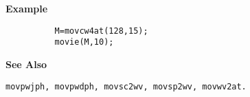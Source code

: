 {\bf \large {}\selectfont Example}
\begin{verbatim}
          M=movcw4at(128,15); 
          movie(M,10);
\end{verbatim}
\vspace*{.5cm}


{\bf \large {}\selectfont See Also}\\
\hspace*{1.5cm}
\begin{minipage}[t]{13.5cm}
\begin{verbatim}
movpwjph, movpwdph, movsc2wv, movsp2wv, movwv2at.
\end{verbatim}
\end{minipage}
